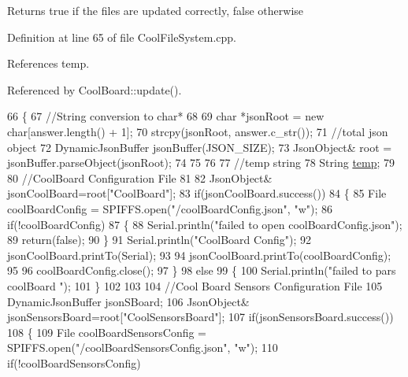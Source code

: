 \begin{DoxyReturn}{Returns}
true if the files are updated correctly, false otherwise 
\end{DoxyReturn}


Definition at line 65 of file Cool\+File\+System.\+cpp.



References temp.



Referenced by Cool\+Board\+::update().


\begin{DoxyCode}
66 \{
67     \textcolor{comment}{//String conversion to char*}
68 
69     \textcolor{keywordtype}{char} *jsonRoot = \textcolor{keyword}{new} \textcolor{keywordtype}{char}[answer.length() + 1];
70     strcpy(jsonRoot, answer.c\_str());
71     \textcolor{comment}{//total json object }
72     DynamicJsonBuffer jsonBuffer(JSON\_SIZE);
73     JsonObject& root = jsonBuffer.parseObject(jsonRoot);
74 
75 
76         
77     \textcolor{comment}{//temp string}
78     String \hyperlink{Irene3000_8h_a5905d48604152cf57aa6bfa087b49173}{temp};
79 
80     \textcolor{comment}{//CoolBoard Configuration File}
81 
82         JsonObject& jsonCoolBoard=root[\textcolor{stringliteral}{"CoolBoard"}];
83     \textcolor{keywordflow}{if}(jsonCoolBoard.success())
84     \{
85         File coolBoardConfig = SPIFFS.open(\textcolor{stringliteral}{"/coolBoardConfig.json"}, \textcolor{stringliteral}{"w"});   
86         \textcolor{keywordflow}{if}(!coolBoardConfig)
87         \{   
88             Serial.println(\textcolor{stringliteral}{"failed to open coolBoardConfig.json"});
89             \textcolor{keywordflow}{return}(\textcolor{keyword}{false});
90         \}
91         Serial.println(\textcolor{stringliteral}{"CoolBoard Config"});
92         jsonCoolBoard.printTo(Serial);
93         
94         jsonCoolBoard.printTo(coolBoardConfig);
95         
96         coolBoardConfig.close();
97     \}
98     \textcolor{keywordflow}{else}
99     \{
100         Serial.println(\textcolor{stringliteral}{"failed to pars coolBoard "});
101     \}       
102 
103     
104     \textcolor{comment}{//Cool Board Sensors Configuration File}
105     DynamicJsonBuffer jsonSBoard;
106         JsonObject& jsonSensorsBoard=root[\textcolor{stringliteral}{"CoolSensorsBoard"}];  
107     \textcolor{keywordflow}{if}(jsonSensorsBoard.success())
108     \{   
109         File coolBoardSensorsConfig = SPIFFS.open(\textcolor{stringliteral}{"/coolBoardSensorsConfig.json"}, \textcolor{stringliteral}{"w"}); 
110         \textcolor{keywordflow}{if}(!coolBoardSensorsConfig)

\end{DoxyCode}
